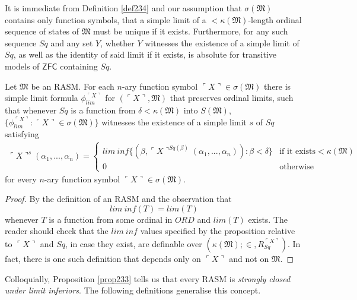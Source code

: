 \documentclass[12pt]{article}
\numberwithin{equation}{section}
\begin{document}
It is immediate from Definition \ref{def234} and our assumption that $\sigma(\mathfrak{M})$ contains only function symbols, that a simple limit of a $< \kappa(\mathfrak{M})$-length ordinal sequence of states of $\mathfrak{M}$ must be unique if it exists. Furthermore, for any such sequence $Sq$ and any set $Y$, whether $Y$ witnesses the existence of a simple limit of $Sq$, as well as the identity of said limit if it exists, is absolute for transitive models of $\mathsf{ZFC}$ containing $Sq$.

\begin{prop}\label{prop233}
Let $\mathfrak{M}$ be an RASM. For each $n$-ary function symbol $\ulcorner X \urcorner \in \sigma(\mathfrak{M})$ there is simple limit formula $\phi_{lim}^{\ulcorner X \urcorner}$ for $(\ulcorner X \urcorner, \mathfrak{M})$ that preserves ordinal limits, such that whenever $Sq$ is a function from $\delta < \kappa(\mathfrak{M})$ into $S(\mathfrak{M})$, $\{\phi_{lim}^{\ulcorner X \urcorner} : \ulcorner X \urcorner \in \sigma(\mathfrak{M})\}$ witnesses the existence of a simple limit $s$ of $Sq$ satisfying 
\begin{gather*}
    \ulcorner X \urcorner^{s} (\alpha_1, ..., \alpha_n) = 
    \begin{cases}
        lim \ inf \{(\beta, \ulcorner X \urcorner^{Sq(\beta)}(\alpha_1, ..., \alpha_n)) : \beta < \delta\} & \!\!\!\! \text{if it exists} < \kappa(\mathfrak{M}) \\
        0 & \!\!\!\! \text{otherwise}
    \end{cases} 
\end{gather*}
for every $n$-ary function symbol $\ulcorner X \urcorner \in \sigma(\mathfrak{M})$.
\end{prop}

\begin{proof}
By the definition of an RASM and the observation that 
\begin{equation*}
    lim \ inf (T) = lim (T)
\end{equation*}
whenever $T$ is a function from some ordinal in $ORD$ and $lim (T)$ exists. The reader should check that the $lim \ inf$ values specified by the proposition relative to $\ulcorner X \urcorner$ and $Sq$, in case they exist, are definable over $(\kappa(\mathfrak{M}); \in, R_{Sq}^{\ulcorner X \urcorner})$. In fact, there is one such definition that depends only on $\ulcorner X \urcorner$ and not on $\mathfrak{M}$.
\end{proof}

Colloquially, Proposition \ref{prop233} tells us that every RASM is \emph{strongly closed under limit inferiors}. The following definitions generalise this concept.
\end{document}
